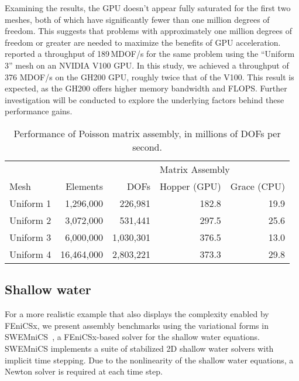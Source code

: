 Examining the results, the GPU doesn't appear fully saturated for the first two meshes, both of which have significantly fewer than one million degrees of freedom. This suggests that problems with approximately one million degrees of freedom or greater are needed to maximize the benefits of GPU acceleration. \cite{trotter2023targeting} reported a throughput of 189\,MDOF/s for the same problem using the ``Uniform 3'' mesh on an NVIDIA V100 GPU. In this study, we achieved a throughput of 376 MDOF/s on the GH200 GPU, roughly twice that of the V100. This result is expected, as the GH200 offers higher memory bandwidth and FLOPS. Further investigation will be conducted to explore the underlying factors behind these performance gains.
\begin{table}[t]
    \centering
\begin{tabular}{lrrrr}
\toprule
          &          &             & \multicolumn{2}{l}{Matrix Assembly} \\
                                     \cmidrule(lr){4-5}
Mesh      & Elements & DOFs        & Hopper (GPU) & Grace (CPU) \\
\midrule
Uniform 1 &  1,296,000 &   226,981 & 182.8 & 19.9 \\
Uniform 2 &  3,072,000 &   531,441 & 297.5 & 25.6 \\
Uniform 3 &  6,000,000 & 1,030,301 & 376.5 & 13.0 \\
Uniform 4 & 16,464,000 & 2,803,221 & 373.3 & 29.8 \\
\bottomrule
\end{tabular}
\caption{Performance of Poisson matrix assembly, in millions of DOFs per second.}
    \label{tab:poisson_results}
\end{table}

\subsection*{Shallow water}
For a more realistic example that also displays the complexity enabled by FEniCSx, we present assembly benchmarks using the variational forms in SWEMniCS~\citep{dawson2024swemnics}, a FEniCSx-based solver for the shallow water equations. SWEMniCS implements a suite of stabilized 2D shallow water solvers with implicit time stepping. Due to the nonlinearity of the shallow water equations, a Newton solver is required at each time step.

